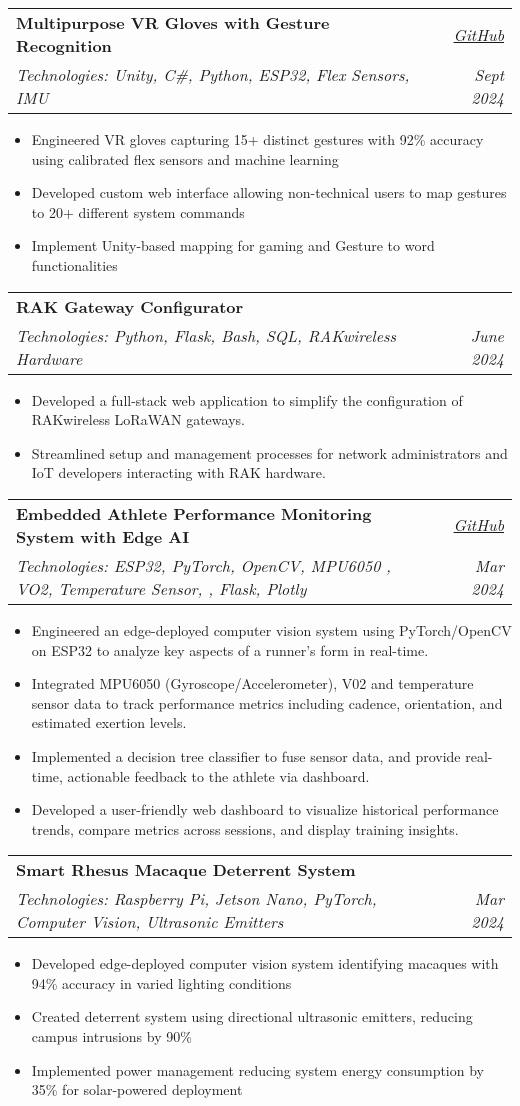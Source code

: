 \documentclass[a4paper,11pt]{article}
\makeatletter
\newcommand{\resumeItemWithoutTitle}[1]{
  \item\small{
    #1 \vspace{-1pt}
  }
}
\newcommand{\resumeSubheading}[4]{
  \vspace{-1pt}\item
    \begin{tabular*}{0.97\textwidth}{l@{\extracolsep{\fill}}r}
      \textbf{\color{Navy}#1} & \textit{#2} \\ %
      \textit{\small#3} & \textit{\small\color{Gray}#4} \\ %
    \end{tabular*}\vspace{-5pt}
}
\newcommand{\resumeItemListStart}{\begin{itemize}[leftmargin=0.2in, topsep=0pt, itemsep=0pt]} %
\newcommand{\resumeItemListEnd}{\end{itemize}\vspace{-2pt}}
\makeatother
\begin{document}
    \resumeSubheading
      {Multipurpose VR Gloves with Gesture Recognition}{\href{https://github.com/watninja68/vr-gloves}{GitHub}}
      {Technologies: Unity, C\#, Python, ESP32, Flex Sensors, IMU}{Sept 2024}
    \resumeItemListStart
        \resumeItemWithoutTitle{Engineered VR gloves capturing 15+ distinct gestures with 92\% accuracy using calibrated flex sensors and machine learning}
        \resumeItemWithoutTitle{Developed custom web interface allowing non-technical users to map gestures to 20+ different system commands}
        \resumeItemWithoutTitle{Implement Unity-based mapping for gaming and Gesture to word functionalities }
    \resumeItemListEnd

     \resumeSubheading
       {RAK Gateway Configurator}{} %
       {Technologies: Python, Flask, Bash, SQL, RAKwireless Hardware}{June 2024}
     \resumeItemListStart
         \resumeItemWithoutTitle{Developed a full-stack web application to simplify the configuration of RAKwireless LoRaWAN gateways.}
         \resumeItemWithoutTitle{Streamlined setup and management processes for network administrators and IoT developers interacting with RAK hardware.}
     \resumeItemListEnd

    \resumeSubheading
    {Embedded Athlete Performance Monitoring System with Edge AI}{\href{https://github.com/watninja68/athlead-}{GitHub}}
    {Technologies: ESP32, PyTorch, OpenCV, MPU6050 , VO2, Temperature Sensor, , Flask, Plotly}{Mar 2024}
    \resumeItemListStart
        \resumeItemWithoutTitle{Engineered an edge-deployed computer vision system using PyTorch/OpenCV on ESP32 to analyze key aspects of a runner's form in real-time.}
        \resumeItemWithoutTitle{Integrated MPU6050 (Gyroscope/Accelerometer), V02 and temperature sensor data to track performance metrics including cadence, orientation, and estimated exertion levels.}
        \resumeItemWithoutTitle{Implemented a decision tree classifier to fuse sensor data, and provide real-time, actionable feedback to the athlete via dashboard.}
        \resumeItemWithoutTitle{Developed a user-friendly web dashboard to visualize historical performance trends, compare metrics across sessions, and display training insights.}
    \resumeItemListEnd

    \resumeSubheading
      {Smart Rhesus Macaque Deterrent System}{} %
      {Technologies: Raspberry Pi, Jetson Nano, PyTorch, Computer Vision, Ultrasonic Emitters}{Mar 2024}
    \resumeItemListStart
        \resumeItemWithoutTitle{Developed edge-deployed computer vision system identifying macaques with 94\% accuracy in varied lighting conditions}
        \resumeItemWithoutTitle{Created deterrent system using directional ultrasonic emitters, reducing campus intrusions by 90\%}
        \resumeItemWithoutTitle{Implemented power management reducing system energy consumption by 35\% for solar-powered deployment}
    \resumeItemListEnd
\end{document}
